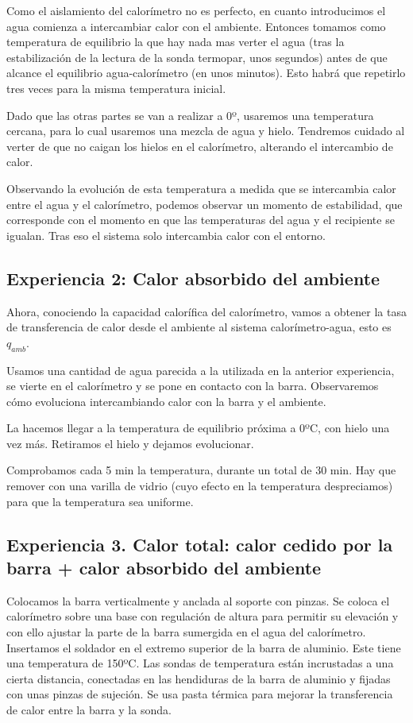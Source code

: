 \documentclass[a4paper,12pt,spanish]{article}
\begin{document}
	Como el aislamiento del calorímetro no es perfecto, en cuanto introducimos el agua comienza a intercambiar calor con el ambiente. Entonces tomamos como temperatura de equilibrio la que hay nada mas verter el agua (tras la estabilización de la lectura de la sonda termopar, unos segundos) antes de que alcance el equilibrio agua-calorímetro (en unos minutos). 
	Esto habrá que repetirlo tres veces para la misma temperatura inicial.
	
	Dado que las otras partes se van a realizar a 0º, usaremos una temperatura cercana, para lo cual usaremos una mezcla de agua y hielo. Tendremos cuidado al verter de que no caigan los hielos en el calorímetro, alterando el intercambio de calor.
	
	\iftrue
	Observando la evolución de esta temperatura a medida que se intercambia calor entre el agua y el calorímetro, podemos observar un momento de estabilidad, que corresponde con el momento en que las temperaturas del agua y el recipiente se igualan. Tras eso el sistema solo intercambia calor con el entorno.
	\fi
	
	\subsection{Experiencia 2: Calor absorbido del ambiente}
	
	Ahora, conociendo la capacidad calorífica del calorímetro, vamos a obtener la tasa de transferencia de calor desde el ambiente al sistema calorímetro-agua, esto es $q_{amb}$.
	
	 Usamos una cantidad de agua parecida a la utilizada en la anterior experiencia, se vierte en el calorímetro y se pone en contacto con la barra. Observaremos cómo evoluciona intercambiando calor con la barra y el ambiente.
	 
	 La hacemos llegar a la temperatura de equilibrio próxima a 0ºC, con hielo una vez más. Retiramos el hielo y dejamos evolucionar.
	 
	 Comprobamos cada 5 min la temperatura, durante un total de 30 min. Hay que remover con una varilla de vidrio (cuyo efecto en la temperatura despreciamos) para que la temperatura sea uniforme.
	 
	\subsection{Experiencia 3. Calor total: calor cedido por la barra + calor absorbido del ambiente}
	
	Colocamos la barra verticalmente y anclada al soporte con pinzas.
	Se coloca el calorímetro sobre una base con regulación de altura para permitir su elevación y con ello ajustar la parte de la barra sumergida en el agua del calorímetro. Insertamos el soldador en el extremo superior de la barra de aluminio. Este tiene una temperatura de 150ºC. Las sondas de temperatura están incrustadas a una cierta distancia, conectadas en las hendiduras de la barra de aluminio y fijadas con unas pinzas de sujeción. Se usa pasta térmica para mejorar la transferencia de calor entre la barra y la sonda.\\
		
\end{document}
